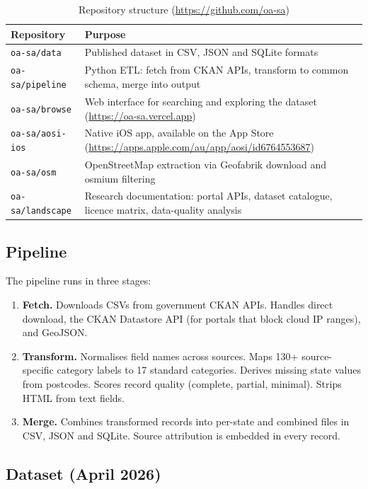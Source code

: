 \documentclass[11pt,a4paper]{article}
\newcommand{\theadstyle}{\cellcolor{headerbg}\textbf}
\begin{document}
\begin{table}[ht!]
\centering
\begin{tabular}{@{}lp{9cm}@{}}
\toprule
\rowcolor{headerbg} \theadstyle{Repository} & \theadstyle{Purpose} \\
\midrule
\texttt{oa-sa/data} & Published dataset in CSV, JSON and SQLite formats \\
\texttt{oa-sa/pipeline} & Python ETL: fetch from CKAN APIs, transform to common schema, merge into output \\
\texttt{oa-sa/browse} & Web interface for searching and exploring the dataset (\url{https://oa-sa.vercel.app}) \\
\texttt{oa-sa/aosi-ios} & Native iOS app, available on the App Store (\url{https://apps.apple.com/au/app/aosi/id6764553687}) \\
\texttt{oa-sa/osm} & OpenStreetMap extraction via Geofabrik download and osmium filtering \\
\texttt{oa-sa/landscape} & Research documentation: portal APIs, dataset catalogue, licence matrix, data-quality analysis \\
\bottomrule
\end{tabular}
\caption{Repository structure (\url{https://github.com/oa-sa})}
\end{table}

\subsection{Pipeline}

The pipeline runs in three stages:

\begin{enumerate}[nosep]
    \item \textbf{Fetch.} Downloads CSVs from government CKAN APIs. Handles direct download, the CKAN Datastore API (for portals that block cloud IP ranges), and GeoJSON.
    \item \textbf{Transform.} Normalises field names across sources. Maps 130+ source-specific category labels to 17 standard categories. Derives missing state values from postcodes. Scores record quality (complete, partial, minimal). Strips HTML from text fields.
    \item \textbf{Merge.} Combines transformed records into per-state and combined files in CSV, JSON and SQLite. Source attribution is embedded in every record.
\end{enumerate}

\subsection{Dataset (April 2026)}
\end{document}
